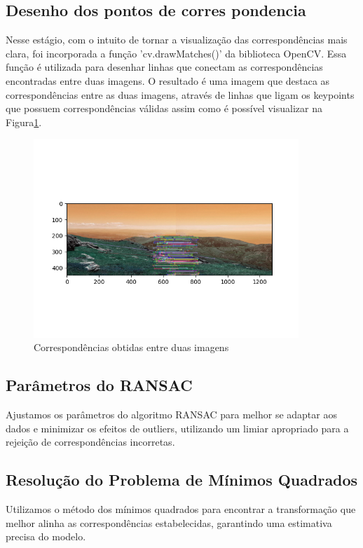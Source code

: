 \documentclass{article}
\begin{document}
\subsection{Desenho dos pontos de corres pondencia}

Nesse estágio, com o intuito de tornar a visualização das correspondências mais clara, foi incorporada a função 'cv.drawMatches()' da biblioteca OpenCV. Essa função é utilizada para desenhar linhas que conectam as correspondências encontradas entre duas imagens. O resultado é uma imagem que destaca as correspondências entre as duas imagens, através de linhas que ligam os keypoints que possuem correspondências válidas assim como é possível visualizar na Figura\ref{fig:matches}. 

\begin{figure}[ht]
    \centering
    \includegraphics[width=10cm]{MatchesPoints_3.png}
    \caption{Correspondências obtidas entre duas imagens}
    \label{fig:matches}
\end{figure}


\subsection{Parâmetros do RANSAC}

Ajustamos os parâmetros do algoritmo RANSAC para melhor se adaptar aos dados e minimizar os efeitos de outliers, utilizando um limiar apropriado para a rejeição de correspondências incorretas.

\subsection{Resolução do Problema de Mínimos Quadrados}

Utilizamos o método dos mínimos quadrados para encontrar a transformação que melhor alinha as correspondências estabelecidas, garantindo uma estimativa precisa do modelo.
\end{document}
